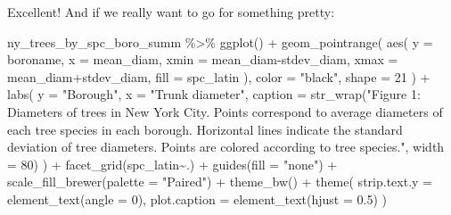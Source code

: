 \documentclass[
]{krantz}
\newenvironment{Shaded}{\begin{snugshade}}{\end{snugshade}}
\newcommand{\AttributeTok}[1]{\textcolor[rgb]{0.77,0.63,0.00}{#1}}
\newcommand{\DecValTok}[1]{\textcolor[rgb]{0.00,0.00,0.81}{#1}}
\newcommand{\FloatTok}[1]{\textcolor[rgb]{0.00,0.00,0.81}{#1}}
\newcommand{\FunctionTok}[1]{\textcolor[rgb]{0.00,0.00,0.00}{#1}}
\newcommand{\NormalTok}[1]{#1}
\newcommand{\SpecialCharTok}[1]{\textcolor[rgb]{0.00,0.00,0.00}{#1}}
\newcommand{\StringTok}[1]{\textcolor[rgb]{0.31,0.60,0.02}{#1}}
\begin{document}
Excellent! And if we really want to go for something pretty:

\begin{Shaded}
\begin{Highlighting}[]
\NormalTok{ny\_trees\_by\_spc\_boro\_summ }\SpecialCharTok{\%\textgreater{}\%}
\FunctionTok{ggplot}\NormalTok{() }\SpecialCharTok{+}
  \FunctionTok{geom\_pointrange}\NormalTok{(}
    \FunctionTok{aes}\NormalTok{(}
      \AttributeTok{y =}\NormalTok{ boroname,}
      \AttributeTok{x =}\NormalTok{ mean\_diam,}
      \AttributeTok{xmin =}\NormalTok{ mean\_diam}\SpecialCharTok{{-}}\NormalTok{stdev\_diam,}
      \AttributeTok{xmax =}\NormalTok{ mean\_diam}\SpecialCharTok{+}\NormalTok{stdev\_diam,}
      \AttributeTok{fill =}\NormalTok{ spc\_latin}
\NormalTok{    ), }\AttributeTok{color =} \StringTok{"black"}\NormalTok{, }\AttributeTok{shape =} \DecValTok{21}
\NormalTok{  ) }\SpecialCharTok{+}
  \FunctionTok{labs}\NormalTok{(}
    \AttributeTok{y =} \StringTok{"Borough"}\NormalTok{, }
    \AttributeTok{x =} \StringTok{"Trunk diameter"}\NormalTok{,}
    \AttributeTok{caption =} \FunctionTok{str\_wrap}\NormalTok{(}\StringTok{"Figure 1: Diameters of trees in New York City. Points correspond to average diameters of each tree species in each borough. Horizontal lines indicate the standard deviation of tree diameters. Points are colored according to tree species."}\NormalTok{, }\AttributeTok{width =} \DecValTok{80}\NormalTok{)}
\NormalTok{  ) }\SpecialCharTok{+}
  \FunctionTok{facet\_grid}\NormalTok{(spc\_latin}\SpecialCharTok{\textasciitilde{}}\NormalTok{.) }\SpecialCharTok{+}
  \FunctionTok{guides}\NormalTok{(}\AttributeTok{fill =} \StringTok{"none"}\NormalTok{) }\SpecialCharTok{+}
  \FunctionTok{scale\_fill\_brewer}\NormalTok{(}\AttributeTok{palette =} \StringTok{"Paired"}\NormalTok{) }\SpecialCharTok{+}
  \FunctionTok{theme\_bw}\NormalTok{() }\SpecialCharTok{+}
  \FunctionTok{theme}\NormalTok{(}
    \AttributeTok{strip.text.y =} \FunctionTok{element\_text}\NormalTok{(}\AttributeTok{angle =} \DecValTok{0}\NormalTok{),}
    \AttributeTok{plot.caption =} \FunctionTok{element\_text}\NormalTok{(}\AttributeTok{hjust =} \FloatTok{0.5}\NormalTok{)}
\NormalTok{  )}
\end{Highlighting}
\end{Shaded}
\end{document}
